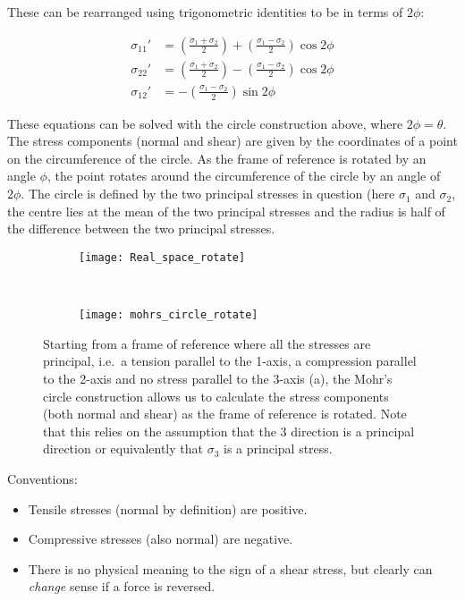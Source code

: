These can be rearranged using trigonometric identities to be in terms of $2\phi$:

\begin{align}
\sigma_{11}' &= \left(\frac{\sigma_1 + \sigma_2}{2} \right) + \left( \frac{\sigma_1 - \sigma_2}{2} \right)\cos 2\phi \nonumber \\
\sigma_{22}' &= \left( \frac{\sigma_1 + \sigma_2}{2} \right) - \left( \frac{\sigma_1 - \sigma_2}{2} \right)\cos 2 \phi \\
\sigma_{12}' &= - \left( \frac{\sigma_1 - \sigma_2}{2}\right) \sin 2\phi
\end{align}

These equations can be solved with the circle construction above, where $2\phi = \theta$. The stress components (normal and shear) are given by the coordinates of a point on the circumference of the circle. As the frame of reference is rotated by an angle $\phi$, the point rotates around the circumference of the circle by an angle of $2\phi$. The circle is defined by the two principal stresses in question (here $\sigma_1$ and $\sigma_2$, the centre lies at the mean of the two principal stresses and the radius is half of the difference between the two principal stresses.

\begin{figure}[h!]
    \centering
    \begin{subfigure}{0.45\textwidth}
        \centering
        \texttt{[image: Real\_space\_rotate]}
        \caption{}
    \end{subfigure}
~
    \begin{subfigure}{0.45\textwidth}
        \centering
        \texttt{[image: mohrs\_circle\_rotate]}
        \caption{}
    \end{subfigure}
    \caption{Starting from a frame of reference where all the stresses are principal, i.e.\ a tension parallel to the 1-axis, a compression parallel to the 2-axis and no stress parallel to the 3-axis (a), the Mohr's circle construction allows us to calculate the stress components (both normal and shear) as the frame of reference is rotated. Note that this relies on the assumption that the 3 direction is a principal direction or equivalently that $\sigma_3$ is a principal stress.
    }
\end{figure}


\begin{annotation}
Conventions:
\begin{itemize}
\item Tensile stresses (normal by definition) are positive.
\item Compressive stresses (also normal) are negative.
\item There is no physical meaning to the sign of a shear stress, but clearly can \emph{change} sense if a force is reversed.
\end{itemize}
\end{annotation}




